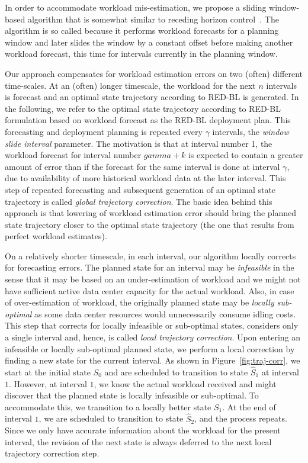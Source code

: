 In order to accommodate workload mis-estimation, we propose a sliding window-based algorithm that is somewhat similar to receding horizon control~\cite{rhc}. The algorithm is so called because it performs workload forecasts for a planning window and later slides the window by a constant offset before making another workload forecast, this time for intervals currently in the planning window. 

Our approach compensates for workload estimation errors on two (often) different time-scales. At an (often) longer timescale, the workload for the next $n$ intervals is forecast and an optimal state trajectory according to RED-BL is generated. In the following, we refer to the optimal state trajectory according to RED-BL formulation based on workload forecast as the RED-BL deployment plan. This forecasting and deployment planning is repeated every $\gamma$ intervals, the \textit{window slide interval} parameter. The motivation is that at interval number 1, the workload forecast for interval number $gamma+k$ is expected to contain a greater amount of error than if the forecast for the same interval is done at interval $\gamma$, due to availability of more historical workload data at the later interval. This step of repeated forecasting and subsequent generation of an optimal state trajectory is called \textit{global trajectory correction}. The basic idea behind this approach is that lowering of workload estimation error should bring the planned state trajectory closer to the optimal state trajectory (the one that results from perfect workload estimates). 

On a relatively shorter timescale, in each interval, our algorithm locally corrects for forecasting errors. The planned state for an interval may be \textit{infeasible} in the sense that it may be based on an under-estimation of workload and we might not have sufficient active data center capacity for the actual workload. Also, in case of over-estimation of workload, the originally planned state may be \textit{locally sub-optimal} as some data center resources would unnecessarily consume idling costs. This step that corrects for locally infeasible or sub-optimal states, considers only a single interval and, hence, is called \textit{local trajectory correction}. Upon entering an infeasible or locally sub-optimal planned state, we perform a local correction by finding a new state for the current interval. As shown in Figure~\ref{fig:traj-corr}, we start at the initial state $S_0$ and are scheduled to transition to state $\hat{S}_1$ at interval $1$. However, at interval $1$, we know the actual workload received and might discover that the planned state is locally infeasible or sub-optimal. To accommodate this, we transition to a locally better state $S_1$. At the end of interval $1$, we are scheduled to transition to state $\hat{S}_2$, and the process repeats. Since we only have accurate information about the workload for the present interval, the revision of the next state is always deferred to the next local trajectory correction step.

